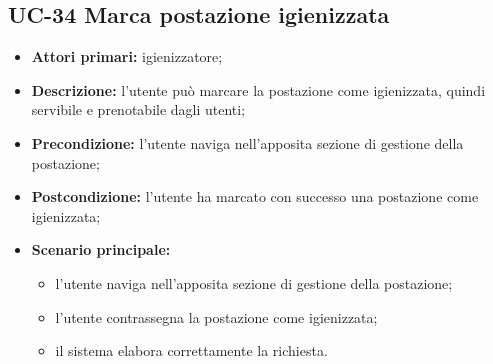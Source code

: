 \subsection{UC-34 Marca postazione igienizzata}

\begin{itemize}
\item \textbf{Attori primari:} igienizzatore;
\item \textbf{Descrizione:} l'utente può marcare la postazione come igienizzata, quindi servibile e prenotabile dagli utenti;
\item \textbf{Precondizione:} l'utente naviga nell’apposita sezione di gestione della postazione; 
\item \textbf{Postcondizione:} l’utente ha marcato con successo una postazione come igienizzata;
\item \textbf{Scenario principale:} 
	\begin{itemize}
		\item l'utente naviga nell’apposita sezione di gestione della postazione;		
		\item l’utente contrassegna la postazione come igienizzata;
		\item il sistema elabora correttamente la richiesta.
	\end{itemize}
\end{itemize}



